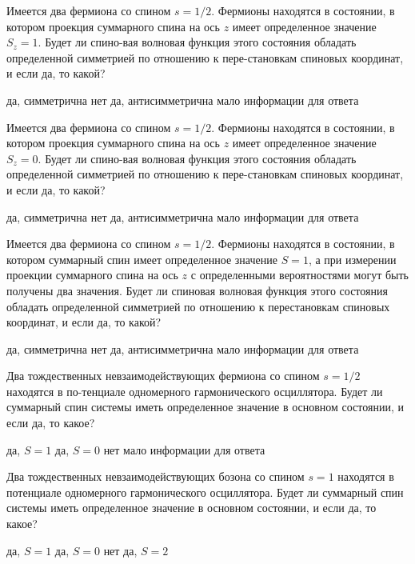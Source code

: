 \documentclass[11pt,a4paper]{exam}
\begin{document}
\begin{questions}
\question Имеется два фермиона со спином $s = 1/2$. Фермионы находятся в состоянии, в котором проекция суммарного спина на ось $z$ имеет определенное значение ${S_z} = 1$. Будет ли спино-вая волновая функция этого состояния обладать определенной симметрией по отношению к пере-становкам спиновых координат, и если да, то какой?
\begin{choices}
\choice да, симметрична         
\choice нет
\choice да, антисимметрична     
\choice мало информации для ответа
\end{choices}

\question Имеется два фермиона со спином $s = 1/2$. Фермионы находятся в состоянии, в котором проекция суммарного спина на ось $z$ имеет определенное значение ${S_z} = 0$. Будет ли спино-вая волновая функция этого состояния обладать определенной симметрией по отношению к пере-становкам спиновых координат, и если да, то какой?
\begin{choices}
\choice да, симметрична         
\choice нет
\choice да, антисимметрична     
\choice мало информации для ответа
\end{choices}

\question Имеется два фермиона со спином $s = 1/2$. Фермионы находятся в состоянии, в котором суммарный спин имеет определенное значение $S = 1$, а при измерении проекции суммарного спина на ось $z$ с определенными вероятностями могут быть получены два значения. Будет ли спиновая волновая функция этого состояния обладать определенной симметрией по отношению к перестановкам спиновых координат, и если да, то какой?
\begin{choices}
\choice да, симметрична         
\choice нет
\choice да, антисимметрична     
\choice мало информации для ответа
\end{choices}

\question Два тождественных невзаимодействующих фермиона со спином $s = 1/2$ находятся в по-тенциале одномерного гармонического осциллятора. Будет ли суммарный спин системы иметь определенное значение в основном состоянии, и если да, то какое? 
\begin{choices}
\choice да, $S = 1$     
\choice да, $S = 0$     
\choice нет      
\choice мало информации для ответа
\end{choices}

\question Два тождественных невзаимодействующих бозона со спином $s = 1$ находятся в потенциале одномерного гармонического осциллятора. Будет ли суммарный спин системы иметь определенное значение в основном состоянии, и если да, то какое? 
\begin{choices}
\choice да, $S = 1$     
\choice да, $S = 0$     
\choice нет      
\choice да, $S = 2$
\end{choices}


\end{questions}
\end{document}
